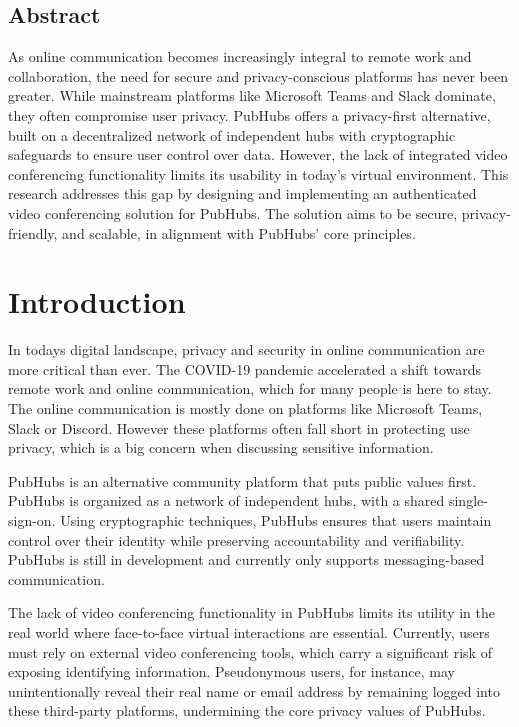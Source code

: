 \documentclass{report}
\begin{document}
\section*{Abstract}
As online communication becomes increasingly integral to remote work and collaboration, the need for secure and
privacy-conscious platforms has never been greater. While mainstream platforms like Microsoft Teams and Slack
dominate, they often compromise user privacy. PubHubs offers a  privacy-first alternative, built on a decentralized
network of independent hubs with cryptographic safeguards to ensure user control over data. However, the lack of
integrated video conferencing functionality limits its usability in today’s virtual environment. This research
addresses this gap by designing and implementing an authenticated video conferencing solution for PubHubs. The
solution aims to be secure, privacy-friendly, and scalable, in alignment with PubHubs’ core principles.


\tableofcontents
\chapter{Introduction}
In todays digital landscape, privacy and security in online communication are more critical than ever.
The COVID-19 pandemic accelerated a shift towards remote work and online communication, which for many people is here to stay.
The online communication is mostly done on platforms like Microsoft Teams, Slack or Discord.
However these platforms often fall short in protecting use privacy, which is a big concern when discussing sensitive
information.

PubHubs is an alternative community platform that puts public values first.
PubHubs is organized as a network of independent hubs, with a shared single-sign-on.
Using cryptographic techniques, PubHubs ensures that users maintain control over their identity while preserving
accountability and verifiability. PubHubs is still in development and currently only supports messaging-based
communication.

The lack of video conferencing functionality in PubHubs limits its utility in the real world where face-to-face
virtual interactions are essential. Currently, users must rely on external video conferencing tools, which carry a
significant risk of exposing identifying information. Pseudonymous users, for instance, may unintentionally reveal
their real name or email address by remaining logged into these third-party platforms, undermining the core privacy
values of PubHubs.
\end{document}
